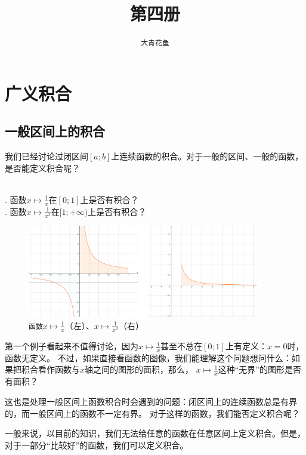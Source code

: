 \documentclass[12pt,UTF8]{ctexbook}
\title{\zihao{0} \bfseries 第四册}
\author{\zihao{2} \texttt{大青花鱼}}
\date{}
\begin{document}
\maketitle
\tableofcontents
\newpage

\chapter{广义积合}

\section{一般区间上的积合}

我们已经讨论过闭区间$[a;b]$上连续函数的积合。对于一般的区间、一般的函数，是否能定义积合呢？

\begin{ex}
    \mbox{} \\
    . 函数$x\mapsto\frac{1}{x}$在$[0;1]$上是否有积合？\\
    . 函数$x\mapsto\frac{1}{x^2}$在$[1;+\infty)$上是否有积合？
\end{ex}

\begin{figure}[h] %
    \vspace{4pt}
    \centering
    \includegraphics[width=0.9\textwidth]{tu/广义积分1.png}
    \caption*{\texttt{函数}$x\mapsto\frac{1}{x}$（左）、$x\mapsto\frac{1}{x^2}$（右）}
\end{figure}

第一个例子看起来不值得讨论，因为$x\mapsto\frac{1}{x}$甚至不总在$[0;1]$上有定义：$x=0$时，函数无定义。
不过，如果直接看函数的图像，我们能理解这个问题想问什么：如果把积合看作函数与$x$轴之间的图形的面积，那么，
$x\mapsto\frac{1}{x}$这种“无界”的图形是否有面积？

这也是处理一般区间上函数积合时会遇到的问题：闭区间上的连续函数总是有界的，而一般区间上的函数不一定有界。
对于这样的函数，我们能否定义积合呢？

一般来说，以目前的知识，我们无法给任意的函数在任意区间上定义积合。但是，对于一部分“比较好”的函数，我们可以定义积合。
\end{document}
